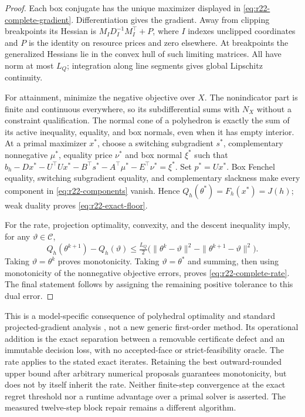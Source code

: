\documentclass[11pt,letterpaper]{article}
\theoremstyle{definition}
\newcommand{\1}{\mathbf 1}
\begin{document}
\begin{proof}
Each box conjugate has the unique maximizer displayed in \eqref{eq:r22-complete-gradient}. Differentiation gives the gradient. Away from clipping breakpoints its Hessian is $M_I D_I^{-1}M_I^\top+P$, where $I$ indexes unclipped coordinates and $P$ is the identity on resource prices and zero elsewhere. At breakpoints the generalized Hessians lie in the convex hull of such limiting matrices. All have norm at most $L_Q$; integration along line segments gives global Lipschitz continuity.

For attainment, minimize the negative objective over $X$. The nonindicator part is finite and continuous everywhere, so its subdifferential sums with $N_X$ without a constraint qualification. The normal cone of a polyhedron is exactly the sum of its active inequality, equality, and box normals, even when it has empty interior. At a primal maximizer $x^*$, choose a switching subgradient $s^*$, complementary nonnegative $\mu^*$, equality price $\nu^*$ and box normal $\xi^*$ such that
$b_h-Dx^*-U^\top Ux^*-B^\top s^*-A^\top\mu^*-E^\top\nu^*=\xi^*$.
Set $p^*=Ux^*$. Box Fenchel equality, switching subgradient equality, and complementary slackness make every component in \eqref{eq:r22-components} vanish. Hence $Q_h(\theta^*)=F_h(x^*)=J(h)$; weak duality proves \eqref{eq:r22-exact-floor}.

For the rate, projection optimality, convexity, and the descent inequality imply, for any $\vartheta\in\mathcal C$,
\[
 Q_h(\theta^{k+1})-Q_h(\vartheta)
 \leq \tfrac{L_Q}{2}\big(\|\theta^k-\vartheta\|^2-\|\theta^{k+1}-\vartheta\|^2\big).
\]
Taking $\vartheta=\theta^k$ proves monotonicity. Taking $\vartheta=\theta^*$ and summing, then using monotonicity of the nonnegative objective errors, proves \eqref{eq:r22-complete-rate}. The final statement follows by assigning the remaining positive tolerance to this dual error.
\end{proof}
This is a model-specific consequence of polyhedral optimality and standard projected-gradient analysis \citep{BoydVandenberghe2004,BeckTeboulle2009}, not a new generic first-order method. Its operational addition is the exact separation between a removable certificate defect and an immutable decision loss, with no accepted-face or strict-feasibility oracle. The rate applies to the stated exact iterates. Retaining the best outward-rounded upper bound after arbitrary numerical proposals guarantees monotonicity, but does not by itself inherit the rate. Neither finite-step convergence at the exact regret threshold nor a runtime advantage over a primal solver is asserted. The measured twelve-step block repair remains a different algorithm.
\end{document}
